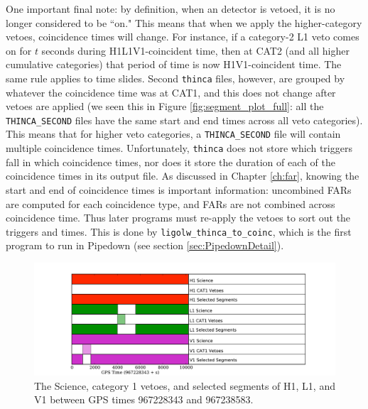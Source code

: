 One important final note: by definition, when an detector is vetoed, it is no
longer considered to be ``on." This means that when we apply the
higher-category vetoes, coincidence times will change. For instance, if a
category-2 L1 veto comes on for $t$ seconds during H1L1V1-coincident time, then
at CAT2 (and all higher cumulative categories) that period of time is now
H1V1-coincident time.  The same rule applies to time slides. Second
\texttt{thinca} files, however, are grouped by whatever the coincidence time
was at CAT1, and this does not change after vetoes are applied (we seen this in
Figure \ref{fig:segment_plot_full}: all the \texttt{THINCA\_SECOND} files have
the same start and end times across all veto categories). This means that for
higher veto categories, a \texttt{THINCA\_SECOND} file will contain multiple
coincidence times. Unfortunately, \texttt{thinca} does not store which triggers
fall in which coincidence times, nor does it store the duration of each of the
coincidence times in its output file. As discussed in Chapter \ref{ch:far},
knowing the start and end of coincidence times is important information:
uncombined \acp{FAR} are computed for each coincidence type, and \acp{FAR} are
not combined across coincidence time. Thus later programs must re-apply the
vetoes to sort out the triggers and times. This is done by
\texttt{ligolw\_thinca\_to\_coinc}, which is the first program to run in
Pipedown (see section \ref{sec:PipedownDetail}).

\begin{figure}[hp]
\center
\includegraphics[width=6in]{figures/segment_plot_science-selected.pdf}
\caption{
The Science, category 1 vetoes, and selected segments of H1, L1, and V1 between
GPS times 967228343 and 967238583.
}
\label{fig:science-selected_segs}
\end{figure}

